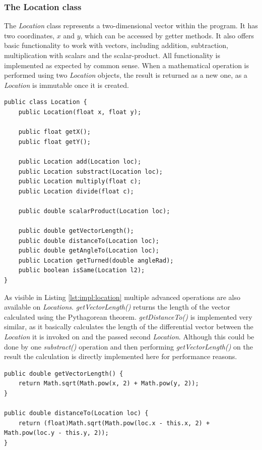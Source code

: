 \subsubsection{The Location class}

The \textit{Location} class represents a two-dimensional vector within the program. It has two coordinates, $x$ and $y$, which can be accessed by getter methods. It also offers basic functionality to work with vectors, including addition, subtraction, multiplication with scalars and the scalar-product. All functionality is implemented as expected by common sense. When a mathematical operation is performed using two \textit{Location} objects, the result is returned as a new one, as a \textit{Location} is immutable once it is created.

\begin{lstlisting}[caption={The public interface of the Location class}, label=lst:impl:location]
public class Location {
	public Location(float x, float y);
	
	public float getX();
	public float getY();
	
	public Location add(Location loc);
	public Location substract(Location loc);
	public Location multiply(float c);
	public Location divide(float c);
	
	public double scalarProduct(Location loc);
	
	public double getVectorLength();
	public double distanceTo(Location loc);
	public double getAngleTo(Location loc);
	public Location getTurned(double angleRad);
	public boolean isSame(Location l2);
}
\end{lstlisting}

As visible in Listing \ref{lst:impl:location} multiple advanced operations are also available on \textit{Locations}. \textit{getVectorLength()} returns the length of the vector calculated using the Pythagorean theorem. \textit{getDistanceTo()} is implemented very similar, as it basically calculates the length of the differential vector between the \textit{Location} it is invoked on and the passed second \textit{Location}. Although this could be done by one \textit{substract()} operation and then performing \textit{getVectorLength()} on the result the calculation is directly implemented here for performance reasons.

\begin{lstlisting}[caption={Implementation of getVectorLength() and getDistanceTo()},label=lst:impl:location_length]
public double getVectorLength() {
	return Math.sqrt(Math.pow(x, 2) + Math.pow(y, 2));
}

public double distanceTo(Location loc) {
	return (float)Math.sqrt(Math.pow(loc.x - this.x, 2) + Math.pow(loc.y - this.y, 2));
}
\end{lstlisting}

